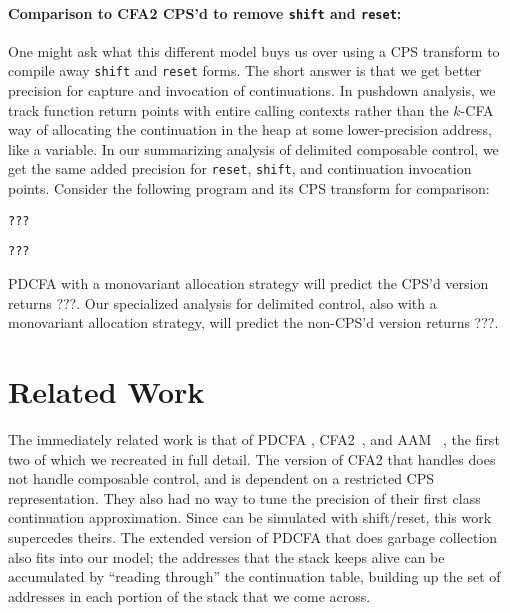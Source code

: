 \paragraph{Comparison to CFA2 CPS'd to remove {\tt shift} and {\tt reset}:}{
  One might ask what this different model buys us over using a CPS transform to compile away {\tt shift} and {\tt reset} forms.
%
The short answer is that we get better precision for capture and invocation of continuations.
%
In pushdown analysis, we track function return points with entire calling contexts rather than the $k$-CFA way of allocating the continuation in the heap at some lower-precision address, like a variable.
%
In our summarizing analysis of delimited composable control, we get the same added precision for {\tt reset}, {\tt shift}, and continuation invocation points.
%
Consider the following program and its CPS transform for comparison:
\begin{lstlisting}
???
\end{lstlisting}

\begin{lstlisting}
???
\end{lstlisting}

PDCFA with a monovariant allocation strategy will predict the CPS'd version returns ???.
%
Our specialized analysis for delimited control, also with a monovariant allocation strategy, will predict the non-CPS'd version returns ???.}

\section{Related Work}

The immediately related work is that of PDCFA \citep{ianjohnson:earl2010pdcfa}, CFA2~\citep{ianjohnson:vardoulakis-lmcs11, ianjohnson:Vardoulakis2011Pushdown}, and AAM ~\citep{dvanhorn:VanHorn2010Abstracting}, the first two of which we recreated in full detail.
%
The version of CFA2 that handles  does not handle composable control, and is dependent on a restricted CPS representation.
%
They also had no way to tune the precision of their first class continuation approximation.
%
Since  can be simulated with shift/reset, this work supercedes theirs.
%
The extended version of PDCFA that does garbage collection~\citep{dvanhorn:Earl2012Introspective} also fits into our model;
the addresses that the stack keeps alive can be accumulated by ``reading through'' the continuation table, building up the set of addresses in each portion of the stack that we come across.

